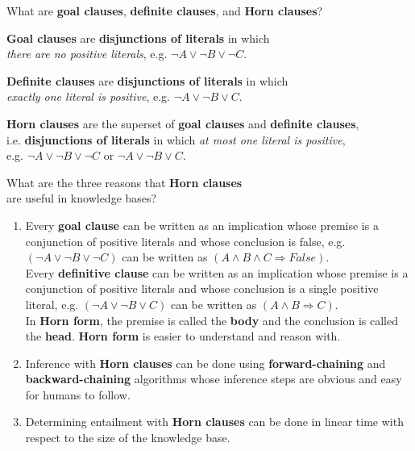 \begin{flashcard}[Question]{What are \textbf{goal clauses}, \textbf{definite clauses}, and \textbf{Horn clauses}?}
\begin{center}
\textbf{Goal clauses} are \textbf{disjunctions of literals} in which\\\textit{there are no positive literals}, e.g. $\neg A \lor \neg B \lor \neg C$.

\medskip

\textbf{Definite clauses} are \textbf{disjunctions of literals} in which\\\textit{exactly one literal is positive}, e.g. $\neg A \lor \neg B \lor C$.

\medskip

\textbf{Horn clauses} are the superset of \textbf{goal clauses} and \textbf{definite clauses},\\i.e. \textbf{disjunctions of literals} in which \textit{at most one literal is positive},\\e.g. $\neg A \lor \neg B \lor \neg C$ or $\neg A \lor \neg B \lor C$.
\end{center}
\end{flashcard}

\begin{flashcard}[Question]{What are the three reasons that \textbf{Horn clauses}\\are useful in knowledge bases?}
\begin{center}
\begin{enumerate}
\item Every \textbf{goal clause} can be written as an implication whose premise is a conjunction of positive literals and whose conclusion is false, e.g. $(\neg A \lor \neg B \lor \neg C)$ can be written as $(A \land B \land C \Rightarrow \textit{False})$.\\Every \textbf{definitive clause} can be written as an implication whose premise is a conjunction of positive literals and whose conclusion is a single positive literal, e.g. $(\neg A \lor \neg B \lor C)$ can be written as $(A \land B \Rightarrow C)$.\\In \textbf{Horn form}, the premise is called the \textbf{body} and the conclusion is called the \textbf{head}. \textbf{Horn form} is easier to understand and reason with.
\item Inference with \textbf{Horn clauses} can be done using \textbf{forward-chaining} and \textbf{backward-chaining} algorithms whose inference steps are obvious and easy for humans to follow.
\item Determining entailment with \textbf{Horn clauses} can be done in linear time with respect to the size of the knowledge base.
\end{enumerate}
\end{center}
\end{flashcard}

